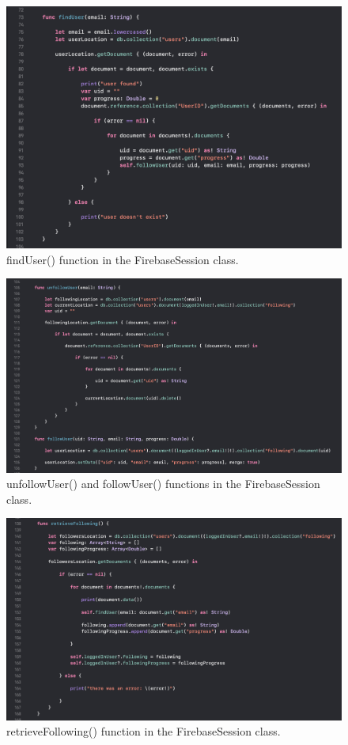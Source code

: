 \begin{figure}[H]
    \centering
    \includegraphics[width=\textwidth]{./graphics/Implementation/Friends/firebasesession1.png}
    \caption{findUser() function in the FirebaseSession class.}
    \label{fig:firebasesession1_friends}
\end{figure}

\begin{figure}[H]
    \centering
    \includegraphics[width=\textwidth]{./graphics/Implementation/Friends/firebasesession2.png}
    \caption{unfollowUser() and followUser() functions in the FirebaseSession class.}
    \label{fig:firebasesession2_friends}
\end{figure}

\begin{figure}[H]
    \centering
    \includegraphics[width=\textwidth]{./graphics/Implementation/Friends/firebasesession3.png}
    \caption{retrieveFollowing() function in the FirebaseSession class.}
    \label{fig:firebasesession3_friends}
\end{figure}